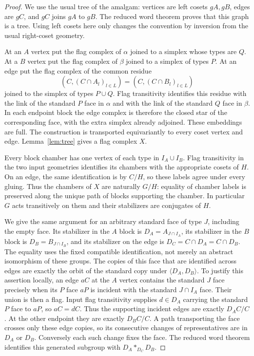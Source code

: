 \begin{proof}
We use the usual tree of the amalgam: vertices are left cosets $gA,gB$,
edges are $gC$, and $gC$ joins $gA$ to $gB$. The reduced word theorem
proves that this graph is a tree. Using left cosets here only changes
the convention by inversion from the usual right-coset geometry.

At an $A$ vertex put the flag complex of $\alpha$ joined to a simplex
whose types are $Q$. At a $B$ vertex put the flag complex of $\beta$
joined to a simplex of types $P$. At an edge put the flag complex of
the common residue
\[
 (C,(C\cap A_l)_{l\in L})=(C,(C\cap B_l)_{l\in L})
\]
joined to the simplex of types $P\cup Q$. Flag transitivity identifies
this residue with the link of the standard $P$ face in $\alpha$ and
with the link of the standard $Q$ face in $\beta$. In each endpoint
block the edge complex is therefore the closed star of the corresponding
face, with the extra simplex already adjoined. These embeddings are full.
The construction is transported equivariantly to every coset vertex
and edge. Lemma~\ref{lem:tree} gives a flag complex $X$.

Every block chamber has one vertex of each type in $I_A\cup I_B$.
Flag transitivity in the two input geometries identifies its chambers
with the appropriate cosets of $H$. On an edge, the same identification
is by $C/H$, so these labels agree under every gluing. Thus the chambers
of $X$ are naturally $G/H$: equality of chamber labels is preserved
along the unique path of blocks supporting the chamber. In particular
$G$ acts transitively on them and their stabilizers are conjugates of $H$.

We give the same argument for an arbitrary standard face of type $J$,
including the empty face. Its stabilizer in the $A$ block is
$D_A=A_{J\cap I_A}$, its stabilizer in the $B$ block is
$D_B=B_{J\cap I_B}$, and its stabilizer on the edge is
$D_C=C\cap D_A=C\cap D_B$. The equality uses the fixed compatible
identification, not merely an abstract isomorphism of these groups.
The copies of this face that are identified across edges are exactly
the orbit of the standard copy under $\langle D_A,D_B\rangle$.
To justify this assertion locally, an edge $aC$ at the $A$ vertex
contains the standard $J$ face precisely when its $P$ face $aP$ is
incident with the standard $J\cap I_A$ face. Their union is then a
flag. Input flag transitivity supplies $d\in D_A$ carrying the
standard $P$ face to $aP$, so $aC=dC$. Thus the supporting incident
edges are exactly $D_A C/C$. At the other endpoint they are exactly
$D_B C/C$. A path transporting the face crosses only these edge
copies, so its consecutive changes of representatives are in $D_A$ or $D_B$.
Conversely each such change fixes the face. The reduced word theorem
identifies this generated subgroup with $D_A*_{D_C}D_B$.


\end{proof}
